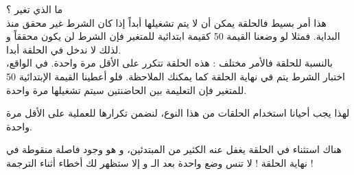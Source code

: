 ما الذي تغير ؟\\
هذا أمر بسيط فالحلقة 
يمكن أن لا يتم تشغيلها أبداً إذا كان الشرط غير محقق منذ البداية. فمثلا لو وضعنا القيمة 50 كقيمة ابتدائية للمتغير 
فإن الشرط لن يكون محققاً و لذلك لا ندخل في الحلقة أبدا.\\
بالنسبة للحلقة 
فالأمر مختلف : هذه الحلقة تتكرر على الأقل مرة واحدة. في الواقع، اختبار الشرط يتم في نهاية الحلقة كما يمكنك الملاحظة. فلو أعطينا القيمة الإبتدائية 50 للمتغير 
فإن التعليمة بين الحاضنتين سيتم تشغيلها مرة واحدة. 

لهذا يجب أحيانا استخدام الحلقات من هذا النوع، لنضمن تكرارها للعملية على الأقل مرة واحدة.

\begin{warning}
هناك استثناء في الحلقة 
يغفل عنه الكثير من المبتدئين، و هو وجود فاصلة منقوطة في نهاية الحلقة ! لا تنس وضع واحدة بعد الـ
و إلا ستظهر لك أخطاء أثناء الترجمة !
\end{warning}
